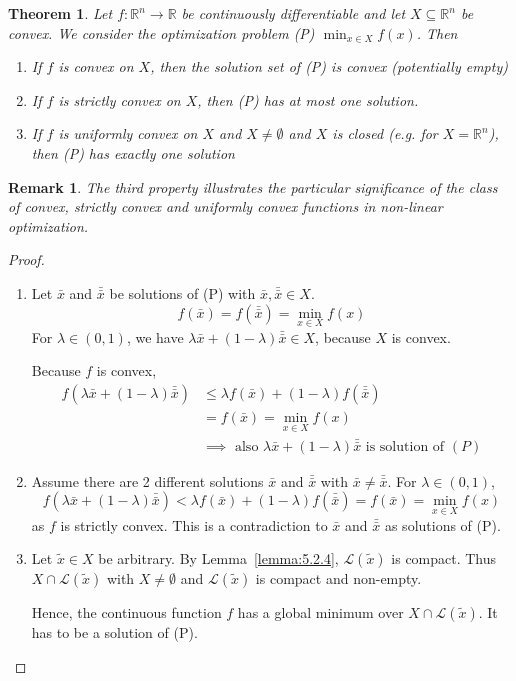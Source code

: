 \documentclass[a4paper]{article}
\newcounter{lecref}[subsection]
\numberwithin{lecref}{subsection}
\newtheorem{theorem}[lecref]{Theorem}
\newtheorem*{Remark}{Remark}
\begin{document}
\begin{theorem}
	\label{theorem:5.2.5}
	Let $f: \mathbb R^n \to \mathbb R$ be continuously differentiable and let $X \subseteq \mathbb R^n$ be convex.
	We consider the optimization problem (P) $\min_{x \in X} f(x)$. Then
	\begin{enumerate}
		\item If $f$ is convex on $X$, then the solution set of (P) is convex (potentially empty)
		\item If $f$ is strictly convex on $X$, then (P) has at most one solution.
		\item If $f$ is uniformly convex on $X$ and $X \neq \emptyset$ and $X$ is closed (e.g. for $X = \mathbb R^n$), then (P) has exactly \emph{one} solution
	\end{enumerate}
\end{theorem}

\begin{Remark}
	The third property illustrates the particular significance of the class of convex, strictly convex and uniformly convex functions in non-linear optimization.
\end{Remark}

\begin{proof}
	\begin{enumerate}
		\item Let $\bar x$ and $\bar{\bar x}$ be solutions of (P) with $\bar x, \bar{\bar x} \in X$.
		\[ f(\bar x) = f(\bar{\bar x}) = \min_{x \in X} f(x) \]
		For $\lambda \in (0, 1)$, we have $\lambda \bar{x} + (1 - \lambda) \bar{\bar x} \in X$, because $X$ is convex.

		Because $f$ is convex,
		\begin{align*}
			f(\lambda \bar{x} + (1 - \lambda) \bar{\bar x})
				&\leq \lambda f(\bar x) + (1 - \lambda) f(\bar{\bar x}) \\
				&= f(\bar{x}) = \min_{x \in X} f(x) \\
				&\implies \text{ also } \lambda \bar{x} + (1 - \lambda) \bar{\bar x} \text{ is solution of } (P)
		\end{align*}
		\item Assume there are 2 different solutions $\bar x$ and $\bar{\bar x}$ with $\bar x \neq \bar{\bar x}$.
			For $\lambda \in (0, 1)$,
			\[ f(\lambda \bar x + (1 - \lambda) \bar{\bar x}) < \lambda f(\bar{x}) + (1 - \lambda) f(\bar{\bar x}) = f(\bar x) = \min_{x \in X} f(x) \]
			as $f$ is strictly convex.
			This is a contradiction to $\bar{x}$ and $\bar{\bar x}$ as solutions of (P).
		\item Let $\tilde x \in X$ be arbitrary. By Lemma~\ref{lemma:5.2.4}, $\mathcal L(\tilde x)$ is compact.
			Thus $X \cap \mathcal L(\tilde x)$ with $X \neq \emptyset$ and $\mathcal L(\tilde x)$ is compact and non-empty.

			Hence, the continuous function $f$ has a global minimum over $X \cap \mathcal L(\tilde x)$.
			It has to be a solution of (P).
	\end{enumerate}
\end{proof}
\end{document}
